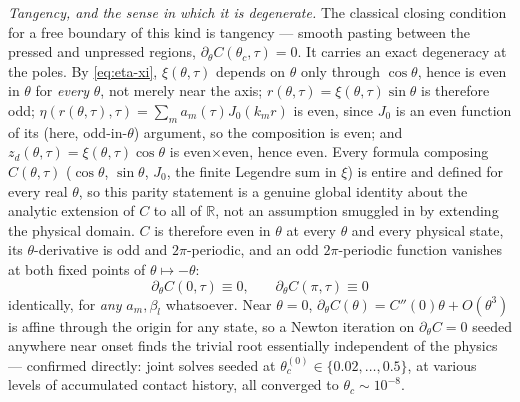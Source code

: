 \emph{Tangency, and the sense in which it is degenerate.} The classical closing condition for a free boundary of this kind is tangency --- smooth pasting between the pressed and unpressed regions, $\partial_\theta C(\theta_c,\tau)=0$. It carries an exact degeneracy at the poles. By \eqref{eq:eta-xi}, $\xi(\theta,\tau)$ depends on $\theta$ only through $\cos\theta$, hence is even in $\theta$ for \emph{every} $\theta$, not merely near the axis; $r(\theta,\tau)=\xi(\theta,\tau)\sin\theta$ is therefore odd; $\eta(r(\theta,\tau),\tau)=\sum_ma_m(\tau)J_0(k_mr)$ is even, since $J_0$ is an even function of its (here, odd-in-$\theta$) argument, so the composition is even; and $z_d(\theta,\tau)=\xi(\theta,\tau)\cos\theta$ is even$\times$even, hence even. Every formula composing $C(\theta,\tau)$ ($\cos\theta$, $\sin\theta$, $J_0$, the finite Legendre sum in $\xi$) is entire and defined for every real $\theta$, so this parity statement is a genuine global identity about the analytic extension of $C$ to all of $\mathbb R$, not an assumption smuggled in by extending the physical domain. $C$ is therefore even in $\theta$ at every $\theta$ and every physical state, its $\theta$-derivative is odd and $2\pi$-periodic, and an odd $2\pi$-periodic function vanishes at both fixed points of $\theta\mapsto-\theta$:
\begin{equation}
    \partial_\theta C(0,\tau)\equiv0\text{,}\qquad \partial_\theta C(\pi,\tau)\equiv0
    \label{eq:tangency-degenerate}
\end{equation}
identically, for \emph{any} $a_m,\beta_l$ whatsoever. Near $\theta=0$, $\partial_\theta C(\theta)=C''(0)\theta+O(\theta^3)$ is affine through the origin for any state, so a Newton iteration on $\partial_\theta C=0$ seeded anywhere near onset finds the trivial root essentially independent of the physics --- confirmed directly: joint solves seeded at $\theta_c^{(0)}\in\{0.02,\dots,0.5\}$, at various levels of accumulated contact history, all converged to $\theta_c\sim10^{-8}$.

